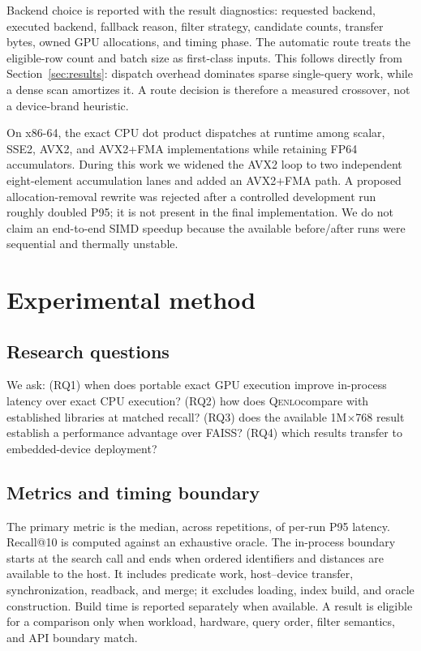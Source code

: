 \documentclass{article}
\newcommand{\qenlo}{\textsc{Qenlo}}
\begin{document}
Backend choice is reported with the result diagnostics: requested backend, executed backend,
fallback reason, filter strategy, candidate counts, transfer bytes, owned GPU allocations, and
timing phase. The automatic route treats the eligible-row count and batch size as first-class
inputs. This follows directly from Section~\ref{sec:results}: dispatch overhead dominates sparse
single-query work, while a dense scan amortizes it. A route decision is therefore a measured
crossover, not a device-brand heuristic.

On x86-64, the exact CPU dot product dispatches at runtime among scalar, SSE2, AVX2, and
AVX2+FMA implementations while retaining FP64 accumulators. During this work we widened the AVX2
loop to two independent eight-element accumulation lanes and added an AVX2+FMA path. A proposed
allocation-removal rewrite was rejected after a controlled development run roughly doubled P95;
it is not present in the final implementation. We do not claim an end-to-end SIMD speedup because
the available before/after runs were sequential and thermally unstable.

\section{Experimental method}

\subsection{Research questions}

We ask: (RQ1) when does portable exact GPU execution improve in-process latency over exact CPU
execution? (RQ2) how does \qenlo compare with established libraries at matched recall? (RQ3) does
the available 1M$\times$768 result establish a performance advantage over FAISS? (RQ4) which
results transfer to embedded-device deployment?

\subsection{Metrics and timing boundary}

The primary metric is the median, across repetitions, of per-run P95 latency. Recall@10 is
computed against an exhaustive oracle. The in-process boundary starts at the search call and ends
when ordered identifiers and distances are available to the host. It includes predicate work,
host--device transfer, synchronization, readback, and merge; it excludes loading, index build, and
oracle construction. Build time is reported separately when available. A result is eligible for a
comparison only when workload, hardware, query order, filter semantics, and API boundary match.
\end{document}
